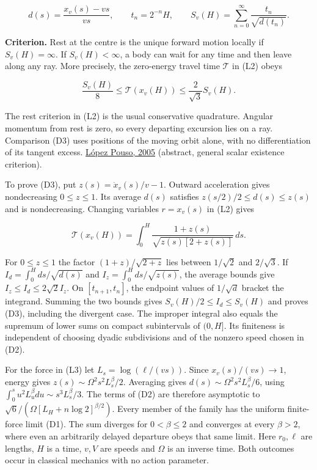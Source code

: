 \documentclass[11pt,a4paper]{article}
\begin{document}
\[
 d(s)=\frac{x_v(s)-vs}{vs},\qquad
 t_n=2^{-n}H,\qquad
 S_v(H)=\sum_{n=0}^\infty\frac{t_n}{\sqrt{d(t_n)}}. \tag{D2}
\]

\textbf{Criterion.} Rest at the centre is the unique forward motion
locally if \(S_v(H)=\infty\). If \(S_v(H)<\infty\), a body can wait for
any time and then leave along any ray. More precisely, the zero-energy
travel time \(\mathcal T\) in (L2) obeys

\[
 \frac{S_v(H)}8\le \mathcal T(x_v(H))
            \le\frac{2}{\sqrt3} S_v(H). \tag{D3}
\]

The rest criterion in (L2) is the usual conservative quadrature. Angular
momentum from rest is zero, so every departing excursion lies on a ray.
Comparison (D3) uses positions of the moving orbit alone, with no
differentiation of its tangent excess.
\href{https://doi.org/10.1112/S0024610705006319}{López Pouso, 2005}
(abstract, general scalar existence criterion).

To prove (D3), put \(z(s)=\dot x_v(s)/v-1\). Outward acceleration gives
nondecreasing \(0\le z\le1\). Its average \(d(s)\) satisfies
\(z(s/2)/2\le d(s)\le z(s)\) and is nondecreasing. Changing variables
\(r=x_v(s)\) in (L2) gives

\[
 \mathcal T(x_v(H))
   =\int_0^H\frac{1+z(s)}{\sqrt{z(s)[2+z(s)]}}\,ds .
\]

For \(0\le z\le1\) the factor \((1+z)/\sqrt{2+z}\) lies between
\(1/\sqrt2\) and \(2/\sqrt3\). If \(I_d=\int_0^H ds/\sqrt{d(s)}\) and
\(I_z=\int_0^H ds/\sqrt{z(s)}\), the average bounds give
\(I_z\le I_d\le2\sqrt2 I_z\). On \([t_{n+1},t_n]\), the endpoint values
of \(1/\sqrt d\) bracket the integrand. Summing the two bounds gives
\(S_v(H)/2\le I_d\le S_v(H)\) and proves (D3), including the divergent
case. The improper integral also equals the supremum of lower sums on
compact subintervals of \((0,H]\). Its finiteness is independent of
choosing dyadic subdivisions and of the nonzero speed chosen in (D2).

For the force in (L3) let \(L_s=\log(\ell/(vs))\). Since
\(x_v(s)/(vs)\to1\), energy gives \(z(s)\sim\Omega^2s^2 L_s^\beta/2\).
Averaging gives \(d(s)\sim\Omega^2s^2 L_s^\beta/6\), using
\(\int_0^s u^2 L_u^\beta du\sim s^3 L_s^\beta/3\). The terms of (D2) are
therefore asymptotic to \(\sqrt6/(\Omega[L_H+n\log2]^{\beta/2})\). Every
member of the family has the uniform finite-force limit (D1). The sum
diverges for \(0<\beta\le2\) and converges at every \(\beta>2\), where
even an arbitrarily delayed departure obeys that same limit. Here
\(r_0,\ell\) are lengths, \(H\) is a time, \(v,V\) are speeds and
\(\Omega\) is an inverse time. Both outcomes occur in classical
mechanics with no action parameter.
\end{document}
